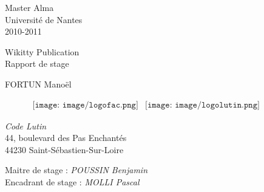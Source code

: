 \documentclass[12pt,a4paper,utf8x]{article}
\begin{document}
\begin{titlepage}

\begin{center}
\normalsize{Master Alma\\
	Université de Nantes\\
	2010-2011}\\

\huge
{
	
	\vspace{15mm}
	\Huge{Wikitty Publication}\\
	\normalsize{Rapport de stage}
}
\vspace{5mm}

\large{FORTUN Manoël}

\vspace{25mm}


\begin{figure}[htb]
  \begin{center}$
    \begin{array}{cc}
      \texttt{[image: image/logofac.png]} &	
      \texttt{[image: image/logolutin.png]}	
    \end{array}$
  \end{center}
\end{figure}

	\normalsize{\emph{Code Lutin}\\
	44, boulevard des Pas Enchantés\\
	44230 Saint-Sébastien-Sur-Loire\\
}


	\vspace{25mm}	
	Maitre de stage : \emph{POUSSIN Benjamin} \\
	Encadrant de stage : \emph{MOLLI Pascal}
\end{center}




\end{titlepage} 





\clearpage
\newpage
\null
\newpage


\clearpage

\clearpage

\clearpage

\tableofcontents


\clearpage

\clearpage

\clearpage

\clearpage

\clearpage

\clearpage

\clearpage

\clearpage

\clearpage

\clearpage

\end{document}
